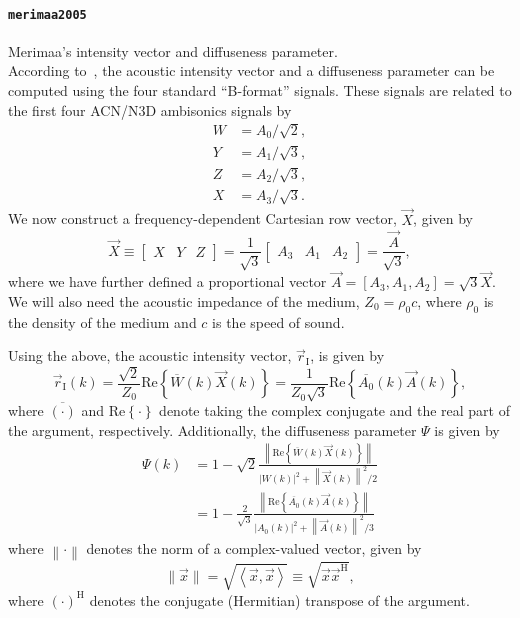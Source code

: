 \documentclass[11pt, oneside]{article}
\newcommand{\function}[1]{\paragraph*{\texttt{#1}}}
\begin{document}
\function{merimaa2005} Merimaa's intensity vector and diffuseness parameter. \\
According to~\citet{MerimaaPulkki2005}, the acoustic intensity vector and a diffuseness parameter can be computed using the four standard ``B-format'' signals.
These signals are related to the first four ACN/N3D ambisonics signals by
\begin{equation}
\begin{split}
W &= A_0 / \sqrt{2}, \\
Y &= A_1 / \sqrt{3}, \\
Z &= A_2 / \sqrt{3}, \\
X &= A_3 / \sqrt{3}.
\end{split}
\end{equation}
We now construct a frequency-dependent Cartesian row vector, $\vec{X}$, given by
\begin{equation}
\vec{X} \equiv \begin{bmatrix} X & Y & Z \end{bmatrix} = \frac{1}{\sqrt{3}} \begin{bmatrix} A_3 & A_1 & A_2 \end{bmatrix} = \frac{\vec{A}}{\sqrt{3}},
\end{equation}
where we have further defined a proportional vector $\vec{A} = \left[ A_3, A_1, A_2 \right] = \sqrt{3} \vec{X}$.
We will also need the acoustic impedance of the medium, $Z_0 = \rho_0 c$, where $\rho_0$ is the density of the medium and $c$ is the speed of sound.

Using the above, the acoustic intensity vector, $\vec{r}_{\textrm{I}}$, is given by~\citep{MerimaaPulkki2005}
\begin{equation}\label{eq:merimaa2005_rI}
\vec{r}_{\textrm{I}}(k) = \frac{\sqrt{2}}{Z_0} \text{Re} \left\{ \overline{W}(k) \vec{X}(k) \right\} = \frac{1}{{Z_0 \sqrt{3}}} \text{Re} \left\{ \overline{A_0}(k) \vec{A}(k) \right\},
\end{equation}
where $\overline{(\cdot)}$ and $\text{Re} \left\{ \cdot \right\}$ denote taking the complex conjugate and the real part of the argument, respectively.
Additionally, the diffuseness parameter $\Psi$ is given by~\citep{MerimaaPulkki2005}
\begin{align}\label{eq:merimaa2005_Psi}
\Psi(k) &= 1 - \sqrt{2} \frac{ \left\| \text{Re} \left\{ \overline{W}(k) \vec{X}(k) \right\} \right\|}{\left| W(k) \right|^2 + \left\| \vec{X}(k) \right\|^2 / 2} \\
	&= 1 - \frac{2}{\sqrt{3}} \frac{ \left\| \text{Re} \left\{ \overline{A_0}(k) \vec{A}(k) \right\} \right\|}{\left| A_0(k) \right|^2 + \left\| \vec{A}(k) \right\|^2 / 3}
\end{align}
where $\left\| \cdot \right\|$ denotes the norm of a complex-valued vector, given by
\begin{equation}
\| \vec{x} \| = \sqrt{\left\langle \vec{x}, \vec{x} \right\rangle} \equiv \sqrt{\vec{x} \vec{x}^\text{H}},
\end{equation}
where $(\cdot)^\text{H}$ denotes the conjugate (Hermitian) transpose of the argument.
\end{document}
